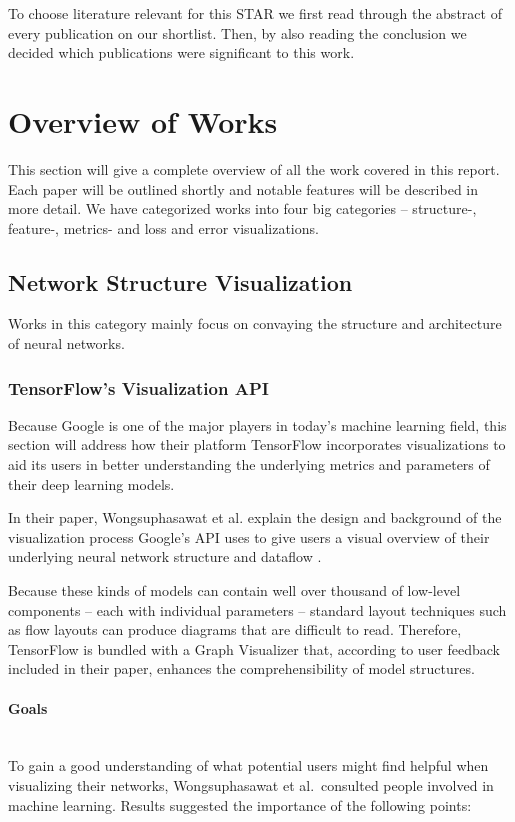 \documentclass{acmsiggraph}               %
\newcommand{\paragraphbr}[1]{\paragraph{#1}\mbox{}\\}
\begin{document}
To choose literature relevant for this STAR we first read through the abstract of every publication on our shortlist. Then, by also reading the conclusion we decided which publications were significant to this work.

\section{Overview of Works}
This section will give a complete overview of all the work covered in this report. Each paper will be outlined shortly and notable features will be described in more detail. We have categorized works into four big categories -- structure-, feature-, metrics- and loss and error visualizations.

\subsection{Network Structure Visualization}
Works in this category mainly focus on convaying the structure and architecture of neural networks.

\subsubsection{TensorFlow's Visualization API}
Because Google is one of the major players in today's machine learning field, this section will address how their platform TensorFlow incorporates visualizations to aid its users in better understanding the underlying metrics and parameters of their deep learning models.

In their paper, Wongsuphasawat et al. explain the design and background of the visualization process Google's API uses to give users a visual overview of their underlying neural network structure and dataflow \cite{Wongsuphasawat2018}.

Because these kinds of models can contain well over thousand of low-level components -- each with individual parameters -- standard layout techniques such as flow layouts can produce diagrams that are difficult to read. Therefore, TensorFlow is bundled with a Graph Visualizer that, according to user feedback included in their paper, enhances the comprehensibility of model structures.

\paragraphbr{Goals}

To gain a good understanding of what potential users might find helpful when visualizing their networks, Wongsuphasawat et al.~consulted people involved in machine learning. Results suggested the importance of the following points:
\end{document}
